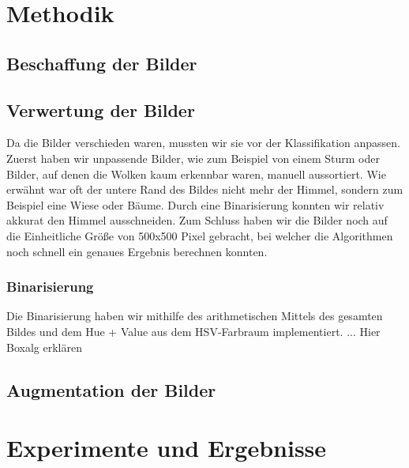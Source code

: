 \documentclass[a4,german]{article}
\begin{document}
\section{Methodik}


\subsection{Beschaffung der Bilder}

\subsection{Verwertung der Bilder}
Da die Bilder verschieden waren, mussten wir sie vor der Klassifikation anpassen.
Zuerst haben wir unpassende Bilder, wie zum Beispiel von einem Sturm oder Bilder, auf denen die Wolken kaum erkennbar waren, manuell aussortiert.
Wie erwähnt war oft der untere Rand des Bildes nicht mehr der Himmel, sondern zum Beispiel eine Wiese oder Bäume.
Durch eine Binarisierung konnten wir relativ akkurat den Himmel ausschneiden.
Zum Schluss haben wir die Bilder noch auf die Einheitliche Größe von 500x500 Pixel gebracht, bei welcher die Algorithmen noch schnell ein genaues Ergebnis berechnen konnten. 

\subsubsection{Binarisierung}
Die Binarisierung haben wir mithilfe des arithmetischen Mittels des gesamten Bildes und dem Hue + Value aus dem HSV-Farbraum implementiert.
...
Hier Boxalg erklären
\subsection{Augmentation der Bilder}




\section{Experimente und Ergebnisse}

\end{document}
